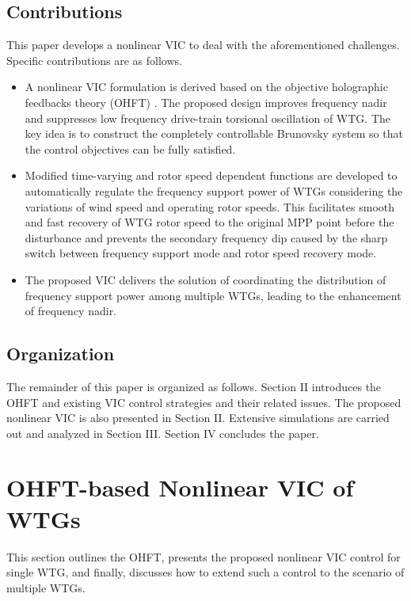 \documentclass[journal]{IEEEtran}
\begin{document}
\vspace{-0.3cm}
\subsection{Contributions}
This paper develops a nonlinear VIC to deal with the aforementioned challenges. Specific contributions are as follows.

\begin{itemize}
\item A nonlinear VIC formulation is derived based on the objective holographic feedbacks theory (OHFT) \cite{Hui2008Nonlinear}. The proposed design improves frequency nadir and suppresses low
frequency drive-train torsional oscillation of WTG.  The key idea is to construct the completely controllable Brunovsky system so that the control objectives can be fully satisfied.

\item Modified time-varying and rotor speed dependent functions are developed to automatically regulate the frequency support power of WTGs considering the variations of wind speed and operating rotor speeds. This facilitates smooth and fast recovery of WTG rotor speed to the original MPP point before the disturbance and prevents the secondary frequency dip caused by the sharp switch between frequency support mode and rotor speed recovery mode.

\item The proposed VIC delivers the solution of coordinating the distribution of frequency support power among multiple WTGs, leading to the enhancement of frequency nadir.
\end{itemize}

\vspace{-0.3cm}
\subsection{Organization}
The remainder of this paper is organized as follows. Section II introduces the OHFT and existing VIC control strategies and their related issues.  The proposed nonlinear VIC is also presented in Section II. Extensive simulations are carried out and analyzed in Section III. Section IV concludes the paper.

\vspace{-0.3cm}
\section{OHFT-based Nonlinear VIC of WTGs}
This section outlines the OHFT, presents the proposed nonlinear VIC control for single WTG, and finally, discusses how to extend such a control to the scenario of multiple WTGs.
\end{document}
